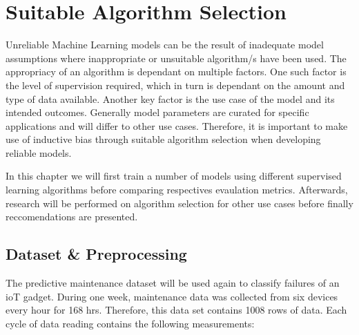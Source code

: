 
\chapter{Suitable Algorithm Selection}
Unreliable Machine Learning models can be the result of inadequate model assumptions where inappropriate or unsuitable algorithm/s have been used.
The appropriacy of an algorithm is dependant on multiple factors. One such factor is the level of supervision required, which in turn is dependant on the amount and type of data available.
Another key factor is the use case of the model and its intended outcomes. Generally model parameters are curated for specific applications and will differ to other use cases.
Therefore, it is important to make use of inductive bias\cite{saria2019tutorial} through suitable algorithm selection when developing reliable models.

In this chapter we will first train a number of models using different supervised learning algorithms before comparing respectives evaulation metrics. 
Afterwards, research will be performed on algorithm selection for other use cases before finally reccomendations are presented.

\section{Dataset \& Preprocessing}
The predictive maintenance dataset will be used again to classify failures of an ioT gadget.
During one week, maintenance data was collected from six devices every hour for 168 hrs.
Therefore, this data set contains 1008 rows of data. 
Each cycle of data reading contains the following measurements: 


